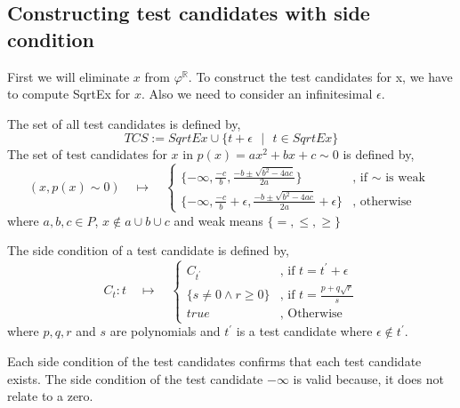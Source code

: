 \subsection{Constructing test candidates with side condition}
First we will eliminate $x$ from $\varphi^\mathbb{R}$. To construct the test candidates for x, we have to compute SqrtEx for $x$. Also we need to consider an infinitesimal $\epsilon$.
\begin{mdframed}[hidealllines=true,backgroundcolor=blue!20,innerleftmargin=3pt,innerrightmargin=3pt,leftmargin=-3pt,rightmargin=-3pt]
	\begin{definition}
		\label{def:construction_of_test_candidates}
		The set of all test candidates is defined by,
		$$ TCS := SqrtEx \cup \{t+\epsilon \text{ } \lvert  \text{ }t\in SqrtEx\} $$
		The set of test candidates for $x$ in $p(x) = ax^{2} + bx + c \sim 0$ is defined by,
		$$
		(x, p(x)\sim 0)
		\quad \mapsto \quad 
		\left\{
		\begin{array}{ll}
		{\displaystyle \{-\infty,\frac{-c}{b},\frac{-b \pm \sqrt{b^{2}-4ac}}{2a}\}} 
		& 
		\text{, if }\sim \text{ is weak }
		\\[0.6cm] %
		{\displaystyle \{-\infty,\frac{-c}{b} + \epsilon,\frac{-b \pm \sqrt{b^{2}-4ac}}{2a}+\epsilon\}}
		& 
		\text{, otherwise }
		\end{array}
		\right.$$
		where $a, b, c \in P$, $x\notin a\cup b\cup c $ and weak means $\{=,\leq,\geq\}$
		
		The side condition of a test candidate is defined by,
		$$
		C_t: t
		\quad \mapsto \quad 
		\left\{
		\begin{array}{lll}
		{\displaystyle C_{t^{\prime}}}
		& 
		\text{, if } t = t^{\prime} + \epsilon
		\\[0.6cm] %
		{\displaystyle \{s\neq 0 \wedge r\geq 0\}}
		& 
		\text{, if } t = \frac{p+q\sqrt{r}}{s}
		\\[0.6cm] %
		{\displaystyle true}
		& 
		\text{, Otherwise }
		\end{array}
		\right.$$
		where $p, q, r$ and $s$ are polynomials and $t^{\prime}$ is a test candidate where $\epsilon \notin t^{\prime}$.
	\end{definition}
\end{mdframed}

Each side condition of the test candidates confirms that each test candidate exists. The side condition of the test candidate $-\infty$ is valid because, it does not relate to a zero.

